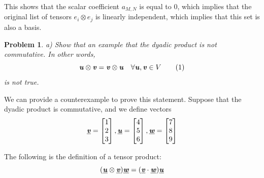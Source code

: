 \documentclass[12pt]{article}
\newtheorem{problem}{Problem}
\begin{document}
This shows that the scalar coefficient \(a_{M,N}\) is equal to \(0\), which implies that the original list of tensors \(e_i \otimes  e_j\) is linearly independent, which implies that this set is also a basis.

\begin{problem}
        a) Show that an example that the dyadic product is not commutative. In other words,
        \[
        \textbf{\textit{u}} \otimes \textbf{\textit{v}}   = \textbf{\textit{v}} \otimes  \textbf{\textit{u}}   \quad \forall \textbf{\textit{u}} , \textbf{\textit{v}}  \in V \tag{1}
        \]
        is \textit{not} true.
    \end{problem}
        We can provide a counterexample to prove this statement. Suppose that the dyadic product is commutative, and we define vectors 
        \[ \underline{\textbf{\textit{v}}} = 
            \begin{bmatrix}
                 1 \\
                 2 \\
                 3 \\
            \end{bmatrix},\underline{\textbf{\textit{u}}} = 
            \begin{bmatrix}
                 4 \\
                 5 \\
                 6 \\
            \end{bmatrix},
            \underline{\textbf{\textit{w}}} =
            \begin{bmatrix}
                 7 \\
                 8 \\
                 9 \\
            \end{bmatrix}
        \]

        The following is the definition of a tensor product:
\[
    (\underline{\textbf{\textit{u}} } \otimes \underline{\textbf{\textit{v}} } )\underline{\textbf{\textit{w}} } = (\underline{\textbf{\textit{v}} } \cdot \underline{\textbf{\textit{w}} } )\underline{\textbf{\textit{u}} } 
\]
\end{document}
